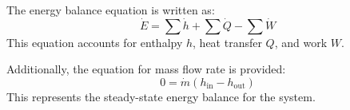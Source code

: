 The energy balance equation is written as:  
\[
\dot{E} = \sum \dot{h} + \sum \dot{Q} - \sum \dot{W}
\]  
This equation accounts for enthalpy \( h \), heat transfer \( Q \), and work \( W \).  

Additionally, the equation for mass flow rate is provided:  
\[
0 = \dot{m} (h_{\text{in}} - h_{\text{out}})
\]  
This represents the steady-state energy balance for the system.